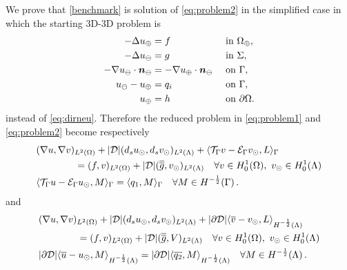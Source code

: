 We prove that \eqref{benchmark} is solution of \eqref{eq:problem2} in the
simplified case in which the starting 3D-3D problem is
\begin{subequations}\label{eq:dirneu_simple}
\begin{align}
- \Delta u_{\oplus}  &= f  && \text{ in } \Omega_{\oplus},\\
- \Delta u_{\ominus} &= g  && \text{ in } \Sigma,\\
-\nabla u_{\ominus} \cdot \boldsymbol n_{\ominus} &= -\nabla u_{\oplus} \cdot \boldsymbol n_{\ominus}  && \text{ on } \Gamma,\\
u_{\ominus} - u_{\oplus} &= q_i  && \text{ on }  \Gamma,\\
u_{\oplus} &= h && \text{ on } \partial \Omega.
\end{align}
\end{subequations}
instead of \eqref{eq:dirneu}. Therefore the reduced problem in \eqref{eq:problem1} and
\eqref{eq:problem2} become respectively
%
\begin{subequations}\label{eq:problem1_simple}
\begin{align}
\label{eq:problem1_simple_eq1}
&(\nabla u,\nabla v)_{L^2(\Omega)} + |{\cal D}|(d_s \ud,d_s \vd)_{L^2(\Lambda)} 
+ \langle \mathcal{T}_{\Gamma} v  - \mathcal{E}_{\Gamma} \vd, L \rangle_\Gamma
\\
\nonumber
&\qquad\qquad= (f,v)_{L^2(\Omega)} + |{\cal D}| (\avrd{g},\vd)_{L^2(\Lambda)}
\quad \forall v \in H^1_0(\Omega), \ \vd \in H^1_0(\Lambda)
\\
\label{eq:problem1_simple_eq2}
&   \langle \mathcal{T}_{\Gamma} u - \mathcal{E}_{\Gamma} \ud , M \rangle_\Gamma =  \langle q_1 , M \rangle_\Gamma
\quad \forall M \in H^{-\frac12}(\Gamma)\,.
\end{align}
\end{subequations}
and
\begin{subequations}\label{eq:problem2_simple}
  \begin{align}
    \label{eq:problem2_simple_eq1}
&(\nabla u,\nabla v)_{L^2(\Omega)} + |{\cal D}|(d_s \ud,d_s \vd)_{L^2(\Lambda)} 
+ |{\partial \cal D}| \langle \avrc{v} - \vd, L \rangle_{H^{-\frac12}(\Lambda)} 
\\
\nonumber
&\qquad\qquad= (f,v)_{L^2(\Omega)} + |{\cal D}| (\avrd{g},V)_{L^2(\Lambda)}
\quad \forall v \in H^1_0(\Omega), \ \vd \in H^1_0(\Lambda)
\\
\label{eq:problem2_simple_eq2}
&  |\partial {\cal D}| \langle \avrc{u} -  \ud, M \rangle_{H^{-\frac12}(\Lambda)} =
|\partial {\cal D}| \langle \avrc{q_2}, M \rangle_{H^{-\frac12}(\Lambda)}
\quad \forall M \in H^{-\frac12}(\Lambda)\,.
\end{align}
\end{subequations}

